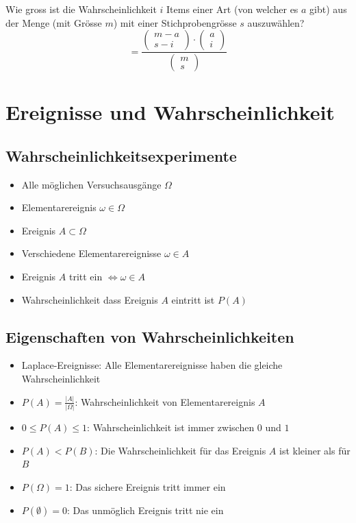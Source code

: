 Wie gross ist die Wahrscheinlichkeit $i$ Items einer Art (von welcher es
$a$ gibt) aus der Menge (mit Grösse $m$) mit einer Stichprobengrösse $s$
auszuwählen?
\[ = \frac{\begin{pmatrix}m-a\\s-i\end{pmatrix} \cdot
  \begin{pmatrix}a\\i\end{pmatrix}}
  {\begin{pmatrix}m\\s\end{pmatrix}} \]

\section{Ereignisse und Wahrscheinlichkeit}
\subsection{Wahrscheinlichkeitsexperimente}
\begin{itemize}
  \item Alle möglichen Versuchsausgänge $\Omega$
  \item Elementarereignis $\omega \in \Omega$
  \item Ereignis $A \subset \Omega$
  \item Verschiedene Elementarereignisse $\omega \in A$
  \item Ereignis $A$ tritt ein $\Leftrightarrow \omega \in A$
  \item Wahrscheinlichkeit dass Ereignis $A$ eintritt ist $P(A)$
\end{itemize}

\subsection{Eigenschaften von Wahrscheinlichkeiten}
\begin{itemize}
  \item Laplace-Ereignisse: Alle Elementarereignisse haben die gleiche
    Wahrscheinlichkeit
  \item $P(A) = \frac{|A|}{|\Omega|}$: Wahrscheinlichkeit von
    Elementarereignis $A$
  \item $0 \le P(A) \le 1$: Wahrscheinlichkeit ist immer zwischen $0$
    und $1$
  \item $P(A) < P(B)$: Die Wahrscheinlichkeit für das Ereignis $A$ ist
    kleiner als für $B$
  \item $P(\Omega) = 1$: Das sichere Ereignis tritt immer ein
  \item $P(\emptyset) = 0$: Das unmöglich Ereignis tritt nie ein
\end{itemize}

